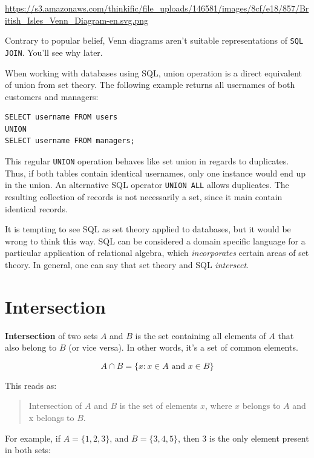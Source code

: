 \documentclass[a4paper, justified, notitlepage, sfsidenotes, notoc]{tufte-book}
\begin{document}
\url{https://s3.amazonaws.com/thinkific/file\_uploads/146581/images/8cf/e18/857/British\_Isles\_Venn\_Diagram-en.svg.png}

Contrary to popular belief, Venn diagrams aren't suitable representations of \texttt{SQL JOIN}. You'll see why later.

When working with databases using SQL, union operation is a direct equivalent of union from set theory. The following example returns all usernames of both customers and managers:

\begin{verbatim}
SELECT username FROM users
UNION
SELECT username FROM managers;
\end{verbatim}

This regular \texttt{UNION} operation behaves like set union in regards to duplicates. Thus, if both tables contain identical usernames, only one instance would end up in the union. An alternative SQL operator \texttt{UNION ALL} allows duplicates. The resulting collection of records is not necessarily a set, since it main contain identical records.

It is tempting to see SQL as set theory applied to databases, but it would be wrong to think this way. SQL can be considered a domain specific language for a particular application of relational algebra, which \emph{incorporates} certain areas of set theory. In general, one can say that set theory and SQL \emph{intersect}.

\section{Intersection}
\label{sec:orgefe83a0}

\textbf{\textbf{Intersection}} of two sets \(A\) and \(B\) is the set containing all elements of \(A\) that also belong to \(B\) (or vice versa). In other words, it's a set of common elements.

\begin{equation}
A \cap B = \{ x : x \in A \textrm{ and } x \in B \}
\end{equation}

This reads as:

\begin{quote}
Intersection of \(A\) and \(B\) is the set of elements \(x\), where \(x\) belongs to \(A\) and x belongs to \(B\).
\end{quote}

For example, if \(A = \{1, 2, 3\}\), and \(B = \{3, 4, 5\}\), then 3 is the only element present in both sets:
\end{document}
